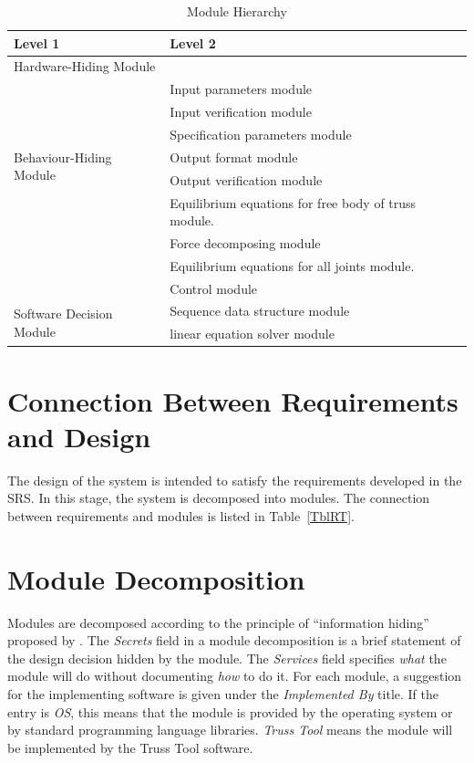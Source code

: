 \documentclass[12pt, titlepage]{article}
\begin{document}
\begin{table}[h!]
\centering
\begin{tabular}{p{} p{}}
\toprule
\textbf{Level 1} & \textbf{Level 2}\\
\midrule

{Hardware-Hiding Module} & ~ \\
\midrule

\multirow{7}{0.3\textwidth}{Behaviour-Hiding Module} & Input parameters module\\
& Input verification module\\
& Specification parameters module\\
& Output format module\\
& Output verification module\\
& Equilibrium equations for free body of truss module. \\
& Force decomposing module\\
& Equilibrium equations for all joints module.\\
& Control module\\ 

\midrule

\multirow{3}{0.3\textwidth}{Software Decision Module} & Sequence data structure module\\
& linear equation solver module\\
\bottomrule

\end{tabular}
\caption{Module Hierarchy}
\label{TblMH}
\end{table}

\section{Connection Between Requirements and Design} \label{SecConnection}

The design of the system is intended to satisfy the requirements developed in
the SRS. In this stage, the system is decomposed into modules. The connection
between requirements and modules is listed in Table~\ref{TblRT}.

\section{Module Decomposition} \label{SecMD}

Modules are decomposed according to the principle of ``information hiding''
proposed by \citet{ParnasEtAl1984}. The \emph{Secrets} field in a module
decomposition is a brief statement of the design decision hidden by the
module. The \emph{Services} field specifies \emph{what} the module will do
without documenting \emph{how} to do it. For each module, a suggestion for the
implementing software is given under the \emph{Implemented By} title. If the
entry is \emph{OS}, this means that the module is provided by the operating
system or by standard programming language libraries.  \emph{Truss Tool} means the
module will be implemented by the Truss Tool software.
\end{document}
